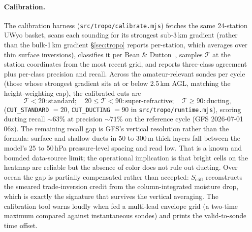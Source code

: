 \documentclass[11pt,a4paper]{article}
\begin{document}
\paragraph{Calibration.} The calibration harness
(\texttt{src/tropo/calibrate.mjs}) fetches the same 24-station
UWyo basket, scans each sounding for its strongest sub-3\,km
gradient (rather than the bulk-1\,km gradient \S\ref{sec:tropo}
reports per-station, which averages over thin surface inversions),
classifies it per Bean \& Dutton~\cite{beandutton1968}, samples
$\mathcal{T}$ at the station coordinates from the most recent grid,
and reports three-class agreement plus per-class precision and
recall.  Across the amateur-relevant sondes per cycle (those whose
strongest gradient sits at or below 2.5\,km AGL, matching the
height-weighting cap), the calibrated cuts are
\begin{equation}\label{eq:tropocuts}
  \mathcal{T} < 20: \text{standard}; \quad
  20 \le \mathcal{T} < 90: \text{super-refractive}; \quad
  \mathcal{T} \ge 90: \text{ducting},
\end{equation}
(\texttt{CUT\_STANDARD} $= 20$, \texttt{CUT\_DUCTING} $= 90$ in
\texttt{src/tropo/runtime.mjs}), scoring ducting recall
${\sim}63\%$ at precision ${\sim}71\%$ on the
reference cycle (GFS 2026-07-01 06z).  The
remaining recall gap is GFS's vertical resolution rather than the
formula: surface and
shallow ducts in 50 to 300\,m thick layers fall between the model's
25 to 50\,hPa pressure-level spacing and read low.
That is a known and bounded data-source limit; the operational
implication is that bright cells on the heatmap are reliable but
the absence of color does not rule out ducting.  Over ocean the
gap is partially compensated rather than accepted:
$S_{\text{cliff}}$ reconstructs the smeared trade-inversion
credit from the column-integrated moisture drop, which is exactly
the signature that survives the vertical averaging.  The
calibration tool warns loudly when fed a multi-lead envelope grid
(a two-time maximum compared against instantaneous sondes) and
prints the valid-to-sonde time offset.
\end{document}
